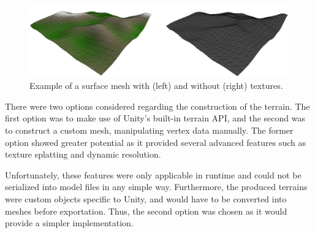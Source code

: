 \begin{figure}[h!]
  \centering
   \includegraphics[width=\textwidth]{figure/terraincomparison.png}
   \caption{Example of a surface mesh with (left) and without (right) textures.}
  \label{fig:terrcomp}
\end{figure}

There were two options considered regarding the construction of the terrain.
The first option was to make use of Unity's built-in terrain API, and the second was to construct a custom mesh, manipulating vertex data manually.
The former option showed greater potential as it provided several advanced features such as texture splatting and dynamic resolution.

Unfortunately, these features were only applicable in runtime and could not be serialized into model files in any simple way.
Furthermore, the produced terrains were custom objects specific to Unity, and would have to be converted into meshes before exportation.
Thus, the second option was chosen as it would provide a simpler implementation.
